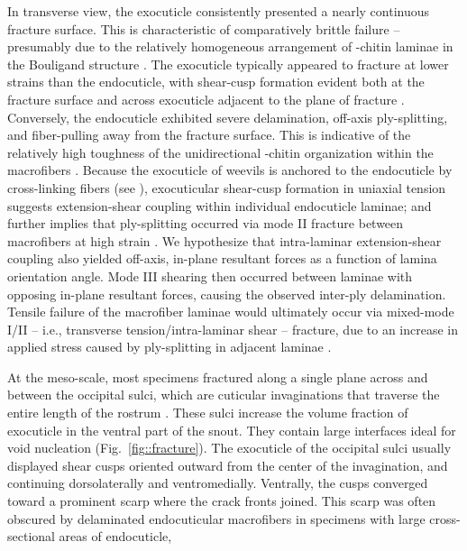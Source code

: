 \documentclass[twocolumn, linenumbers, superscriptaddress, nofootinbib]{revtex4-1}
\begin{document}
		In transverse view, the exocuticle consistently presented a nearly continuous fracture surface.
		This is characteristic of comparatively brittle failure -- presumably due to the relatively homogeneous arrangement of \textalpha-chitin laminae in the Bouligand structure \cite{Nikolov2010, Nikolov2011}.
		The exocuticle typically appeared to fracture at lower strains than the endocuticle, with shear-cusp formation evident both at the fracture surface and across exocuticle adjacent to the plane of fracture \cite{Greenhalgh2009}.
		Conversely, the endocuticle exhibited severe delamination, off-axis ply-splitting, and fiber-pulling away from the fracture surface.
		This is indicative of the relatively high toughness of the unidirectional \textalpha-chitin organization within the macrofibers \cite{Kamp2010, Kamp2015}.
		Because the exocuticle of weevils is anchored to the endocuticle by cross-linking fibers (see \cite{Kamp2015, Longhai2017}), exocuticular shear-cusp formation in uniaxial tension suggests extension-shear coupling within individual endocuticle laminae; and further implies that ply-splitting occurred via mode II fracture between macrofibers at high strain \cite{Jones2014, Reddy2004}.
		We hypothesize that intra-laminar extension-shear coupling also yielded off-axis, in-plane resultant forces as a function of lamina orientation angle.
		Mode III shearing then occurred between laminae with opposing in-plane resultant forces, causing the observed inter-ply delamination.
		Tensile failure of the macrofiber laminae would ultimately occur via mixed-mode I/II -- i.e., transverse tension/intra-laminar shear -- fracture, due to an increase in applied stress caused by ply-splitting in adjacent laminae \cite{Greenhalgh2009}.
		
		At the meso-scale, most specimens fractured along a single plane across and between the occipital sulci, which are cuticular invaginations that traverse the entire length of the rostrum \cite{Davis2014, Dennell1942}.
		These sulci increase the volume fraction of exocuticle in the ventral part of the snout.
		They contain large interfaces ideal for void nucleation (Fig.~\ref{fig::fracture}).
		The exocuticle of the occipital sulci usually displayed shear cusps oriented outward from the center of the invagination, and continuing dorsolaterally and ventromedially.
		Ventrally, the cusps converged toward a prominent scarp where the crack fronts joined.
		This scarp was often obscured by delaminated endocuticular macrofibers in specimens with large cross-sectional areas of endocuticle,
		
\end{document}
